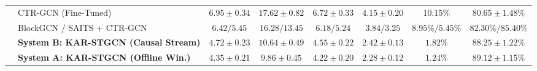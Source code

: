 \documentclass[10pt,twocolumn]{article}
\begin{document}
\begin{table}[!t]
{\begin{tabular}{llcccccc}
& CTR-GCN \cite{chen2021channel} (Fine-Tuned) & $6.95 \pm 0.34$ & $17.62 \pm 0.82$ & $6.72 \pm 0.33$ & $4.15 \pm 0.20$ & $10.15\%$ & $80.65 \pm 1.48\%$ \\
& BlockGCN \cite{zhou2024blockgcn} / SAITS + CTR-GCN & $6.42 / 5.45$ & $16.28 / 13.45$ & $6.18 / 5.24$ & $3.84 / 3.25$ & $8.95\% / 5.45\%$ & $82.30\% / 85.40\%$ \\
& \textbf{System B: KAR-STGCN (Causal Stream)} & $4.72 \pm 0.23$ & $10.64 \pm 0.49$ & $4.55 \pm 0.22$ & $2.42 \pm 0.13$ & $1.82\%$ & $88.25 \pm 1.22\%$ \\
& \textbf{System A: KAR-STGCN (Offline Win.)} & $\mathbf{4.35 \pm 0.21}$ & $\mathbf{9.86 \pm 0.45}$ & $\mathbf{4.22 \pm 0.20}$ & $\mathbf{2.28 \pm 0.12}$ & $\mathbf{1.24\%}$ & $\mathbf{89.12 \pm 1.15\%}$ \\
\bottomrule
\end{tabular}
}
\end{table}
\end{document}
